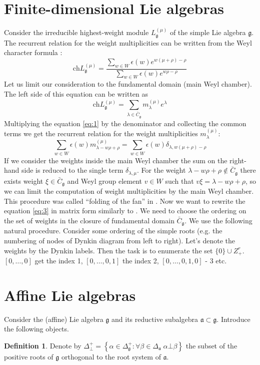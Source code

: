 \documentclass[a4paper,12pt]{article}
\theoremstyle{definition}
\theoremstyle{definition}
\theoremstyle{definition}
\newtheorem{definition}{Definition}
\newcommand{\af}{\mathfrak{a}}
\begin{document}
\section{Finite-dimensional Lie algebras}
\label{sec:finite-dimens-lie}
Consider the irreducible highest-weight module $L^{(\mu)}_{\mathfrak{g}}$ of the simple Lie algebra $\mathfrak{g}$. 
The recurrent relation for the weight multiplicities can be written from the Weyl character formula \cite{lyakhovsky1996rra}:
\begin{equation}
  \label{eq:1}
  \mathrm{ch} L^{(\mu)}_{\mathfrak{g}}=\frac{\sum_{w\in W}\epsilon(w) e^{w(\mu+\rho)-\rho}}{\sum_{w\in W}\epsilon(w) e^{w \rho -\rho}}
\end{equation}
Let us limit our consideration to the fundamental domain (main Weyl chamber). The left side of this equation can be written as
\begin{equation}
  \label{eq:2}
   \mathrm{ch} L^{(\mu)}_{\mathfrak{g}}=\sum_{\lambda\in \bar{C}_{\mathfrak{g}}} m^{(\mu)}_{\lambda} e^{\lambda}
\end{equation}
Multiplying the equation \eqref{eq:1} by the denominator  and collecting the common terms we get the recurrent relation for the weight multiplicities $m^{(\mu)}_{\lambda}$:
\begin{equation}
  \label{eq:3}
  \sum_{w\in W} \epsilon(w) m^{(\mu)}_{\lambda-w\rho+\rho}=\sum_{w\in W}\epsilon(w) \delta_{\lambda,w(\mu+\rho)-\rho}
\end{equation}
If we consider the weights inside the main Weyl chamber the sum on the right-hand side is reduced to the single term $\delta_{\lambda,\mu}$. For the weight $\lambda-w\rho+\rho\not\in \bar{C}_{\mathfrak{g}}$ there exists weight $\xi\in \bar{C}_{\mathfrak{g}}$ and Weyl group element $v\in W$ such that $v\xi=\lambda-w\rho+\rho$, so we can limit the computation of weight multiplicities by the main Weyl chamber. This procedure was called ``folding of the fan'' in \cite{il2010folded}.
Now we want to rewrite the equation \eqref{eq:3} in matrix form similarly to \cite{2010arXiv1001}.
We need to choose the ordering on the set of weights in the closure of fundamental domain $\bar{C}_{\mathfrak{g}}$. We use the following natural procedure. Consider some ordering of the simple roots (e.g. the numbering of nodes of Dynkin diagram from left to right). Let's denote the weights by the Dynkin labels. Then the task is to enumerate the set $\{0\}\cup Z_{+}^r$. $[0,\dots,0]$ get the index 1, $[0,\dots,0,1]$ the index 2, $[0,\dots,0,1,0]$ - 3 etc.
\section{Affine Lie algebras}
\label{sec:affine-lie-algebras}
Consider the (affine) Lie algebra $\mathfrak{g}$  and its reductive subalgebra $\af\subset \mathfrak{g}$. Introduce the following objects.
\begin{definition}
  Denote by $\Delta^{+}_{\bot}=\left\{\alpha\in \Delta^{+}_{\mathfrak{g}}:\forall \beta\in\Delta_{\af} \; \alpha\bot \beta\right\}$ the subset of the positive roots of $\mathfrak{g}$ orthogonal to the root system of $\af$.
\end{definition}
\end{document}
